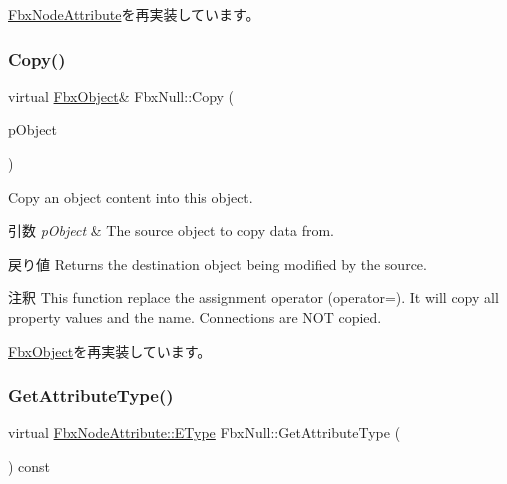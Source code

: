 \hyperlink{class_fbx_node_attribute_a042eb9949a9b9634dcc5f126e82fd04a}{Fbx\+Node\+Attribute}を再実装しています。

\mbox{\label{class_fbx_null_a9427b6a7357d3c8adfc80279bc1db003}} 
\subsubsection{\texorpdfstring{Copy()}{Copy()}}
{\footnotesize\ttfamily virtual \hyperlink{class_fbx_object}{Fbx\+Object}\& Fbx\+Null\+::\+Copy (\begin{DoxyParamCaption}\item[{const \hyperlink{class_fbx_object}{Fbx\+Object} \&}]{p\+Object }\end{DoxyParamCaption})\hspace{0.3cm}{\ttfamily [virtual]}}

Copy an object content into this object. 
\begin{DoxyParams}{引数}
{\em p\+Object} & The source object to copy data from. \\
\hline
\end{DoxyParams}
\begin{DoxyReturn}{戻り値}
Returns the destination object being modified by the source. 
\end{DoxyReturn}
\begin{DoxyRemark}{注釈}
This function replace the assignment operator (operator=). It will copy all property values and the name. Connections are N\+OT copied. 
\end{DoxyRemark}


\hyperlink{class_fbx_object_a0c0c5adb38284d14bb82c04d54504a3e}{Fbx\+Object}を再実装しています。

\mbox{\label{class_fbx_null_a16b32e758ed2fe821e2c895526b71925}} 
\subsubsection{\texorpdfstring{Get\+Attribute\+Type()}{GetAttributeType()}}
{\footnotesize\ttfamily virtual \hyperlink{class_fbx_node_attribute_a08e1669d3d1a696910756ab17de56d6a}{Fbx\+Node\+Attribute\+::\+E\+Type} Fbx\+Null\+::\+Get\+Attribute\+Type (\begin{DoxyParamCaption}{ }\end{DoxyParamCaption}) const\hspace{0.3cm}{\ttfamily [virtual]}}



